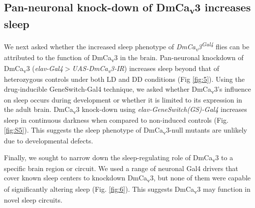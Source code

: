 \subsection*{Pan-neuronal knock-down of DmCa\textsubscript{v}3 increases sleep}

We next asked whether the increased sleep phenotype of \emph{DmCa\textsubscript{v}3\textsuperscript{Gal4}} flies can be attributed to the function of DmCa\textsubscript{v}3 in the brain.
Pan-neuronal knockdown of DmCa\textsubscript{v}3 (\emph{elav-Gal4$>$UAS-DmCa\textsubscript{v}3-IR}) increases sleep beyond that of heterozygous controls under both LD and DD conditions (Fig \ref{fig:5}).
Using the drug-inducible GeneSwitch-Gal4 technique\cite{Osterwalder:2001cl}, we asked whether DmCa\textsubscript{v}3's influence on sleep occurs during development or whether it is limited to its expression in the adult brain.
DmCa\textsubscript{v}3 knock-down using \emph{elav-GeneSwitch(GS)-Gal4} increases sleep in continuous darkness when compared to non-induced controls (Fig.\ref{fig:S5}).
This suggests the sleep phenotype of DmCa\textsubscript{v}3-null mutants are unlikely due to developmental defects.

Finally, we sought to narrow down the sleep-regulating role of DmCa\textsubscript{v}3 to a specific brain region or circuit.
We used a range of neuronal Gal4 drivers that cover known sleep centers to knockdown DmCa\textsubscript{v}3, but none of them were capable of significantly altering sleep (Fig. \ref{fig:6}).
This suggests DmCa\textsubscript{v}3 may function in novel sleep circuits.
